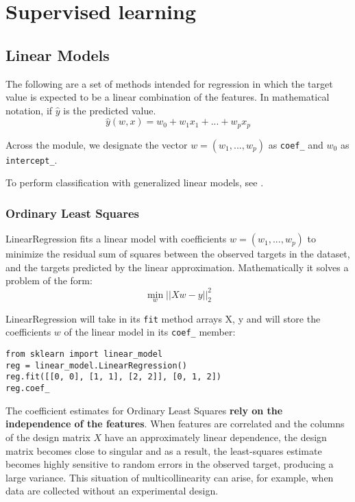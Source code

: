 \chapter{Supervised learning}
\section{Linear Models\label{Linear Models}}
The following are a set of methods intended for regression in which the target value is expected to be a linear combination of the features. In mathematical notation, if $\hat{y}$ is the predicted value.
\begin{equation}
\hat{y}(w, x) = w_0 + w_1 x_1 + ... + w_p x_p
\end{equation}

Across the module, we designate the vector  $w = (w_1,
..., w_p)$ as \verb|coef_| and  $w_0$ as \verb|intercept_|.

To perform classification with generalized linear models, see .
\subsection{Ordinary Least Squares\label{Ordinary Least Squares}}
LinearRegression fits a linear model with coefficients $w = (w_1, ..., w_p)$ to minimize the residual sum of squares between the observed targets in the dataset, and the targets predicted by the linear approximation. Mathematically it solves a problem of the form:
\begin{equation}
\min_{w} || X w - y||_2^2
\end{equation}

LinearRegression will take in its \verb|fit| method arrays X, y and will store the coefficients $w$ of the linear model in its \verb|coef_| member:
\begin{verbatim}
from sklearn import linear_model
reg = linear_model.LinearRegression()
reg.fit([[0, 0], [1, 1], [2, 2]], [0, 1, 2])
reg.coef_
\end{verbatim}
The coefficient estimates for Ordinary Least Squares \textbf{rely on the independence of the features}. When features are correlated and the columns of the design matrix $X$ have an approximately linear dependence, the design matrix becomes close to singular and as a result, the least-squares estimate becomes highly sensitive to random errors in the observed target, producing a large variance. This situation of multicollinearity can arise, for example, when data are collected without an experimental design.

